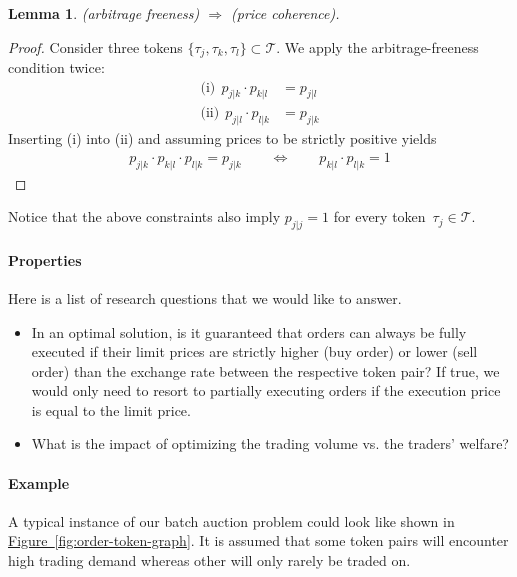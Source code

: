 \documentclass[11pt,parskip=full]{scrartcl}%
\newcommand*{\tokens}{\mathcal{T}}          %
\newcommand*{\figref}[1]{\hyperref[{#1}]{Figure~\ref*{#1}}}
\newtheorem{lemma}[theorem]{Lemma}
\begin{document}
\newpage
\begin{lemma}
  (arbitrage freeness) $ \Rightarrow $ (price coherence).
\end{lemma}
\vspace{-.8cm}
\begin{proof}
  Consider three tokens $ \{\tau_j,\tau_k,\tau_l\} \subset \tokens $.
  We apply the arbitrage-freeness condition twice:
  \begin{align*}
    \text{(i)}  \>\> p_{j|k} \cdot p_{k|l} &= p_{j|l} \\
    \text{(ii)} \>\> p_{j|l} \cdot p_{l|k} &= p_{j|k}
  \end{align*}
  Inserting (i) into (ii) and assuming prices to be strictly positive yields
  \begin{align*}
    p_{j|k} \cdot p_{k|l} \cdot p_{l|k} = p_{j|k}
    \qquad \Leftrightarrow \qquad
    p_{k|l} \cdot p_{l|k} = 1
  \end{align*}
\end{proof}
\vspace{-.4cm}

Notice that the above constraints also imply $ p_{j|j} = 1 $ for every
token~$ \tau_j \in \tokens $.

\paragraph{Properties}

Here is a list of research questions that we would like to answer.

\begin{itemize}
  \item In an optimal solution, is it guaranteed that orders can always be fully executed if their
  limit prices are strictly higher (buy order) or lower (sell order) than the exchange rate between
  the respective token pair?
  If true, we would only need to resort to partially executing orders if the execution price is
  equal to the limit price.
  \item What is the impact of optimizing the trading volume vs. the traders' welfare?
\end{itemize}


\paragraph{Example}

A typical instance of our batch auction problem could look like shown in 
\figref{fig:order-token-graph}.
It is assumed that some token pairs will encounter high trading demand whereas other will only
rarely be traded on.
\end{document}
